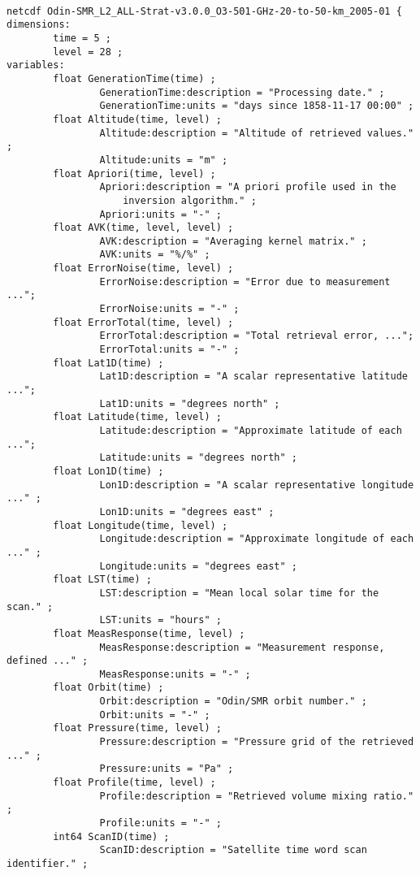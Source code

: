 \begin{verbatim}

netcdf Odin-SMR_L2_ALL-Strat-v3.0.0_O3-501-GHz-20-to-50-km_2005-01 {
dimensions:
        time = 5 ;
        level = 28 ;
variables:
        float GenerationTime(time) ;
                GenerationTime:description = "Processing date." ;
                GenerationTime:units = "days since 1858-11-17 00:00" ;
        float Altitude(time, level) ;
                Altitude:description = "Altitude of retrieved values." ;
                Altitude:units = "m" ;
        float Apriori(time, level) ;
                Apriori:description = "A priori profile used in the
                    inversion algorithm." ;
                Apriori:units = "-" ;
        float AVK(time, level, level) ;
                AVK:description = "Averaging kernel matrix." ;
                AVK:units = "%/%" ;
        float ErrorNoise(time, level) ;
                ErrorNoise:description = "Error due to measurement ...";
                ErrorNoise:units = "-" ;
        float ErrorTotal(time, level) ;
                ErrorTotal:description = "Total retrieval error, ...";
                ErrorTotal:units = "-" ;
        float Lat1D(time) ;
                Lat1D:description = "A scalar representative latitude ...";
                Lat1D:units = "degrees north" ;
        float Latitude(time, level) ;
                Latitude:description = "Approximate latitude of each ...";
                Latitude:units = "degrees north" ;
        float Lon1D(time) ;
                Lon1D:description = "A scalar representative longitude ..." ;
                Lon1D:units = "degrees east" ;
        float Longitude(time, level) ;
                Longitude:description = "Approximate longitude of each ..." ;
                Longitude:units = "degrees east" ;
        float LST(time) ;
                LST:description = "Mean local solar time for the scan." ;
                LST:units = "hours" ;
        float MeasResponse(time, level) ;
                MeasResponse:description = "Measurement response, defined ..." ;
                MeasResponse:units = "-" ;
        float Orbit(time) ;
                Orbit:description = "Odin/SMR orbit number." ;
                Orbit:units = "-" ;
        float Pressure(time, level) ;
                Pressure:description = "Pressure grid of the retrieved ..." ;
                Pressure:units = "Pa" ;
        float Profile(time, level) ;
                Profile:description = "Retrieved volume mixing ratio." ;
                Profile:units = "-" ;
        int64 ScanID(time) ;
                ScanID:description = "Satellite time word scan identifier." ;

\end{verbatim}
